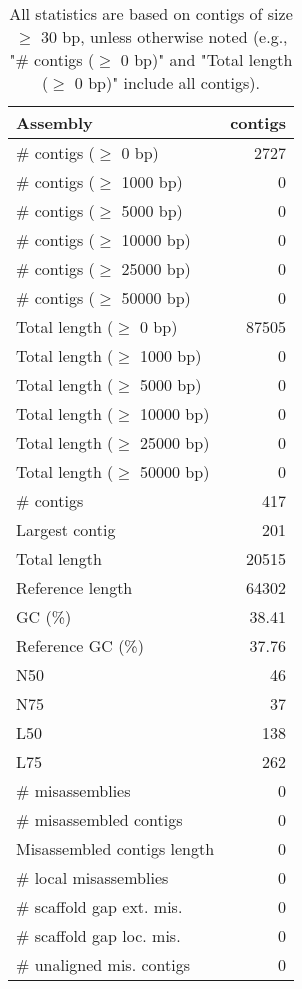 \documentclass[12pt,a4paper]{article}
\begin{document}
\begin{table}[ht]
\begin{center}
\caption{All statistics are based on contigs of size $\geq$ 30 bp, unless otherwise noted (e.g., "\# contigs ($\geq$ 0 bp)" and "Total length ($\geq$ 0 bp)" include all contigs).}
\begin{tabular}{|l*{1}{|r}|}
\hline
Assembly & contigs \\ \hline
\# contigs ($\geq$ 0 bp) & 2727 \\ \hline
\# contigs ($\geq$ 1000 bp) & 0 \\ \hline
\# contigs ($\geq$ 5000 bp) & 0 \\ \hline
\# contigs ($\geq$ 10000 bp) & 0 \\ \hline
\# contigs ($\geq$ 25000 bp) & 0 \\ \hline
\# contigs ($\geq$ 50000 bp) & 0 \\ \hline
Total length ($\geq$ 0 bp) & 87505 \\ \hline
Total length ($\geq$ 1000 bp) & 0 \\ \hline
Total length ($\geq$ 5000 bp) & 0 \\ \hline
Total length ($\geq$ 10000 bp) & 0 \\ \hline
Total length ($\geq$ 25000 bp) & 0 \\ \hline
Total length ($\geq$ 50000 bp) & 0 \\ \hline
\# contigs & 417 \\ \hline
Largest contig & 201 \\ \hline
Total length & 20515 \\ \hline
Reference length & 64302 \\ \hline
GC (\%) & 38.41 \\ \hline
Reference GC (\%) & 37.76 \\ \hline
N50 & 46 \\ \hline
N75 & 37 \\ \hline
L50 & 138 \\ \hline
L75 & 262 \\ \hline
\# misassemblies & 0 \\ \hline
\# misassembled contigs & 0 \\ \hline
Misassembled contigs length & 0 \\ \hline
\# local misassemblies & 0 \\ \hline
\# scaffold gap ext. mis. & 0 \\ \hline
\# scaffold gap loc. mis. & 0 \\ \hline
\# unaligned mis. contigs & 0 \\ \hline

\end{tabular}
\end{center}
\end{table}
\end{document}
